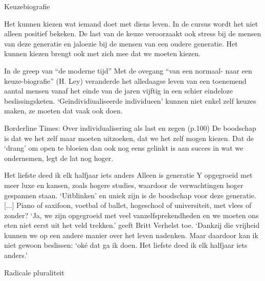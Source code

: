 \documentclass[main.tex]{subfiles}
\begin{document}
\begin{examenvraag}
    \begin{vraag}
        Keuzebiografie
    \end{vraag}

    \begin{antwoord}
        Het kunnen kiezen wat iemand doet met diens leven.
        In de cursus wordt het niet alleen positief bekeken.
        De last van de keuze veroorzaakt ook stress bij de mensen van deze generatie en jaloezie bij de mensen van een oudere generatie.
        Het kunnen kiezen brengt ook met zich mee dat we moeten kiezen.
        \begin{citaat}{In de greep van ``de moderne tijd''}
            Met de ovegang ``van een normaal- naar een keuze-biografie'' (H. Ley) veranderde het alledaagse leven van een toenemend aantal mensen vanaf het einde van de jaren vijftig in een schier eindeloze beslissingsketen.
            `Ge\"individiualiseerde individueen' kunnen niet enkel zelf keuzes maken, ze moeten dat vaak ook doen.
        \end{citaat}
        \begin{citaat}{Borderline Times: Over individualisering als last en zegen (p.100)}
            De boodschap is dat we het zelf maar moeten uitzoeken, dat we het zelf mogen kiezen.
            Dat de `drang' om open te bloeien dan ook nog eens gelinkt is aan succes in wat we ondernemen, legt de lat nog hoger.
        \end{citaat}
        \begin{citaat}{Het liefste deed ik elk halfjaar iets anders}
            Alleen is generatie Y opgegroeid met meer luxe en kansen, zoals hogere studies, waardoor de verwachtingen hoger gespannen staan.
            `Uitblinken' en uniek zijn is de boodschap voor deze generatie.
            [...]
            Piano of saxifoon, voetbal of ballet, hogeschool of universiteit, met vlees of zonder? `Ja, we zijn opgegroeid met veel vanzelfsprekendheden en we moeten ons eten niet eerst uit het veld trekken.' geeft Britt Verhelst toe.
            `Dankzij die vrijheid kunnen we op een andere manier over het leven nadenken.
            Maar daardoor kan ik niet gewoon beslissen: `ok\'e dat ga ik doen. Het liefste deed ik elk halfjaar iets anders.'
        \end{citaat}
    \end{antwoord}
\end{examenvraag}


\begin{examenvraag}
    \begin{vraag}
        Radicale pluraliteit
    \end{vraag}

    \begin{antwoord}

    \end{antwoord}
\end{examenvraag}
\end{document}
